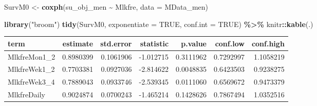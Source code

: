 \documentclass[
]{article}
\newenvironment{Shaded}{\begin{snugshade}}{\end{snugshade}}
\newcommand{\DataTypeTok}[1]{\textcolor[rgb]{0.13,0.29,0.53}{#1}}
\newcommand{\KeywordTok}[1]{\textcolor[rgb]{0.13,0.29,0.53}{\textbf{#1}}}
\newcommand{\NormalTok}[1]{#1}
\newcommand{\OperatorTok}[1]{\textcolor[rgb]{0.81,0.36,0.00}{\textbf{#1}}}
\newcommand{\OtherTok}[1]{\textcolor[rgb]{0.56,0.35,0.01}{#1}}
\newcommand{\StringTok}[1]{\textcolor[rgb]{0.31,0.60,0.02}{#1}}
\begin{document}
\begin{Shaded}
\begin{Highlighting}[]
\NormalTok{SurvM0 \textless{}{-}}\StringTok{  }\KeywordTok{coxph}\NormalTok{(su\_obj\_men }\OperatorTok{\textasciitilde{}}\StringTok{ }\NormalTok{Mlkfre, }
                 \DataTypeTok{data =}\NormalTok{ MData\_men)}

\KeywordTok{library}\NormalTok{(}\StringTok{"broom"}\NormalTok{)}
\KeywordTok{tidy}\NormalTok{(SurvM0, }\DataTypeTok{exponentiate =} \OtherTok{TRUE}\NormalTok{, }\DataTypeTok{conf.int =} \OtherTok{TRUE}\NormalTok{) }\OperatorTok{\%\textgreater{}\%}\StringTok{ }
\StringTok{  }\NormalTok{knitr}\OperatorTok{::}\KeywordTok{kable}\NormalTok{(.)}
\end{Highlighting}
\end{Shaded}

\begin{longtable}[]{@{}lrrrrrr@{}}
\toprule
term & estimate & std.error & statistic & p.value & conf.low &
conf.high\tabularnewline
\midrule
\endhead
MlkfreMon1\_2 & 0.8980399 & 0.1061906 & -1.012715 & 0.3111962 &
0.7292997 & 1.1058219\tabularnewline
MlkfreWek1\_2 & 0.7703381 & 0.0927036 & -2.814622 & 0.0048835 &
0.6423503 & 0.9238275\tabularnewline
MlkfreWek3\_4 & 0.7889043 & 0.0933746 & -2.539345 & 0.0111060 &
0.6569672 & 0.9473379\tabularnewline
MlkfreDaily & 0.9024874 & 0.0700243 & -1.465214 & 0.1428626 & 0.7867494
& 1.0352516\tabularnewline
\bottomrule
\end{longtable}

\begin{Shaded}
\end{Shaded}
\end{document}
